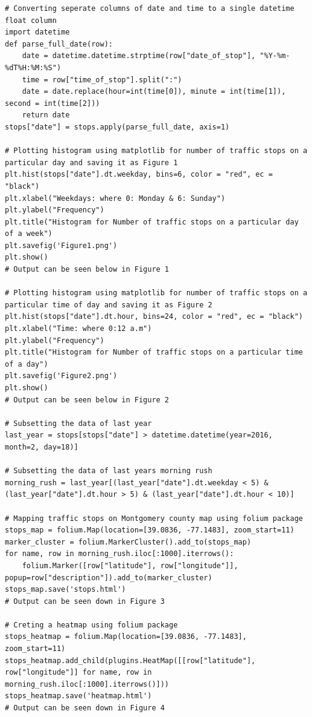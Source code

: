 \documentclass[11pt,oneside]{article}
\begin{document}
\begin{lstlisting}[frame=l, name=Traffic Violations, title={Code for visualization of Traffic violations in Montgomery County}]
# Converting seperate columns of date and time to a single datetime float column
import datetime
def parse_full_date(row):
    date = datetime.datetime.strptime(row["date_of_stop"], "%Y-%m-%dT%H:%M:%S")
    time = row["time_of_stop"].split(":")
    date = date.replace(hour=int(time[0]), minute = int(time[1]), second = int(time[2]))
    return date
stops["date"] = stops.apply(parse_full_date, axis=1)

# Plotting histogram using matplotlib for number of traffic stops on a particular day and saving it as Figure 1
plt.hist(stops["date"].dt.weekday, bins=6, color = "red", ec = "black")
plt.xlabel("Weekdays: where 0: Monday & 6: Sunday")
plt.ylabel("Frequency")
plt.title("Histogram for Number of traffic stops on a particular day of a week")
plt.savefig('Figure1.png')
plt.show()
# Output can be seen below in Figure 1

# Plotting histogram using matplotlib for number of traffic stops on a particular time of day and saving it as Figure 2
plt.hist(stops["date"].dt.hour, bins=24, color = "red", ec = "black")
plt.xlabel("Time: where 0:12 a.m")
plt.ylabel("Frequency")
plt.title("Histogram for Number of traffic stops on a particular time of a day")
plt.savefig('Figure2.png')
plt.show()
# Output can be seen below in Figure 2

# Subsetting the data of last year
last_year = stops[stops["date"] > datetime.datetime(year=2016, month=2, day=18)]

# Subsetting the data of last years morning rush
morning_rush = last_year[(last_year["date"].dt.weekday < 5) & (last_year["date"].dt.hour > 5) & (last_year["date"].dt.hour < 10)]

# Mapping traffic stops on Montgomery county map using folium package
stops_map = folium.Map(location=[39.0836, -77.1483], zoom_start=11)
marker_cluster = folium.MarkerCluster().add_to(stops_map)
for name, row in morning_rush.iloc[:1000].iterrows():
    folium.Marker([row["latitude"], row["longitude"]], popup=row["description"]).add_to(marker_cluster)
stops_map.save('stops.html')
# Output can be seen down in Figure 3

# Creting a heatmap using folium package
stops_heatmap = folium.Map(location=[39.0836, -77.1483], zoom_start=11)
stops_heatmap.add_child(plugins.HeatMap([[row["latitude"], row["longitude"]] for name, row in morning_rush.iloc[:1000].iterrows()]))
stops_heatmap.save('heatmap.html')
# Output can be seen down in Figure 4






\end{lstlisting}
\end{document}
